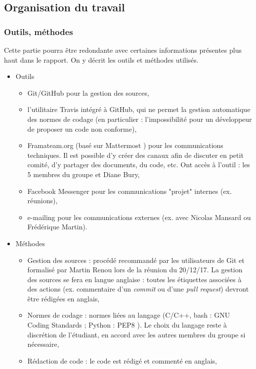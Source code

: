 \documentclass[a4paper,12pt]{report}
\newcommand{\bi}{\begin{itemize}}
\newcommand{\ei}{\end{itemize}}
\newcommand{\itemo}{\item[\textsf{o}]}
\begin{document}
\subsection{Organisation du travail}
\subsubsection{Outils, méthodes}
Cette partie pourra être redondante avec certaines informations présentes plus haut dans le rapport. On y décrit les outils et méthodes utilisés.

\bi
\itemo Outils
	\bi
	\item Git/GitHub pour la gestion des sources,
	\item l'utilitaire Travis \cite{travis} intégré à GitHub, qui ne permet la gestion automatique des normes de codage (en particulier : l'impossibilité pour un développeur de proposer un code non conforme),
	\item Framateam.org (basé sur Mattermost \cite{mattermost}) pour les communications techniques. Il est possible d'y créer des canaux afin de discuter en petit comité, d'y partager des documents, du code, etc. Ont accès à l'outil : les 5 membres du groupe et Diane Bury,
	\item Facebook Messenger pour les communications "projet" internes (ex. réunions), 
	\item e-mailing pour les communications externes (ex. avec Nicolas Mansard ou Frédérique Martin).
	\ei

\itemo Méthodes
	\bi
	\item Gestion des sources : procédé recommandé par les utilisateurs de Git et formalisé par Martin Renou lors de la réunion du 20/12/17. La gestion des sources se fera en langue anglaise : toutes les étiquettes associées à des actions (ex. commentaire d'un \textit{commit} ou d'une \textit{pull request}) devront être rédigées en anglais,
	\item Normes de codage : normes liées au langage (C/C++, bash : GNU Coding Standards \cite{gnu} ; Python : PEP8 \cite{pep8}). Le choix du langage reste à discrétion de l'étudiant, en accord avec les autres membres du groupe si nécessaire,
	\item Rédaction de code : le code est rédigé et commenté en anglais,
	\ei
\ei
\end{document}
